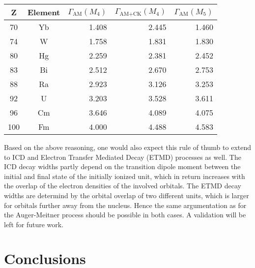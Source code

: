 \documentclass[aps,amssymb,preprint,a4paper,longbibliography]{revtex4}
\begin{document}
{\begin{table*}[ht]
 \begin{tabular}{ccrrr}
 \toprule
 Z & Element & $\Gamma_\text{AM}(M_4)$ & $\Gamma_\text{AM+CK}(M_4)$ & $\Gamma_\text{AM}(M_5)$\\
 \midrule
 70 & Yb & 1.408 & 2.445 & 1.460 \\
 74 & W  & 1.758 & 1.831 & 1.830 \\
 80 & Hg & 2.259 & 2.381 & 2.452 \\
 83 & Bi & 2.512 & 2.670 & 2.753 \\
 88 & Ra & 2.923 & 3.126 & 3.253 \\
 92 & U  & 3.203 & 3.528 & 3.611 \\
 96 & Cm & 3.646 & 4.089 & 4.075 \\
100 & Fm & 4.000 & 4.488 & 4.583 \\
 \bottomrule
 \end{tabular}
 \label{tab:M45}
\end{table*}
}

{Based on the above reasoning, one would also expect}
this rule of thumb to extend to ICD and
Electron Transfer Mediated Decay (ETMD) processes as well. The ICD
decay widths partly depend on the transition dipole moment between the
initial and final state of the initially ionized unit, which in return increases
with the overlap of the electron densities of the involved orbitals.
The ETMD decay widths are determind by the orbital overlap of two different units,
which is larger for orbitals further away from the nucleus.
Hence the same argumentation as for the Auger-Meitner process
{should be possible}
in both cases.
{A validation will be left for future work.}




%
\section{Conclusions}
\label{section:conclusions}
\end{document}
